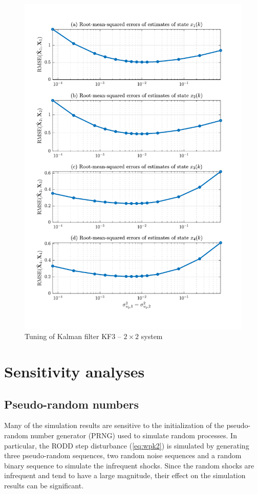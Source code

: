 \begin{figure}[htp]
	\centering
	\includegraphics[width=14cm]{images/rod_obs_sim2_3KF_Q_seed_0.pdf}
	\caption{Tuning of Kalman filter KF3 – $2\times2$ system}
	\label{fig:sim-sys-2x2-KF3-tuning}
\end{figure}
	

\section{Sensitivity analyses}

\subsection{Pseudo-random numbers}

Many of the simulation results are sensitive to the initialization of the pseudo-random number generator (PRNG) used to simulate random processes. In particular, the RODD step disturbance (\ref{eq:wpk2}) is simulated by generating three pseudo-random sequences, two random noise sequences and a random binary sequence to simulate the infrequent shocks.  Since the random shocks are infrequent and tend to have a large magnitude, their effect on the simulation results can be significant.

